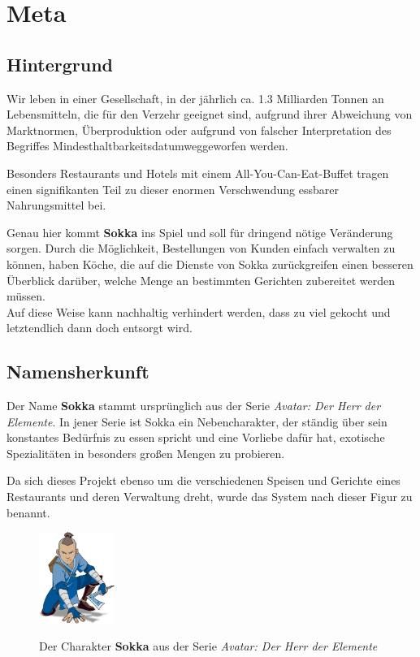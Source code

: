 \chapter{Meta}

\section{Hintergrund}

Wir leben in einer Gesellschaft, in der jährlich ca. 1.3 Milliarden Tonnen an Lebensmitteln, die für den Verzehr geeignet sind, aufgrund ihrer Abweichung von Marktnormen, Überproduktion oder aufgrund von falscher Interpretation des Begriffes \glqq Mindesthaltbarkeitsdatum\grqq\space weggeworfen werden.

Besonders Restaurants und Hotels mit einem All-You-Can-Eat-Buffet tragen einen signifikanten Teil zu dieser enormen Verschwendung essbarer Nahrungsmittel bei.

Genau hier kommt \textbf{Sokka} ins Spiel und soll für dringend nötige Veränderung sorgen. Durch die Möglichkeit, Bestellungen von Kunden einfach verwalten zu können, haben Köche, die auf die Dienste von Sokka zurückgreifen einen besseren Überblick darüber, welche Menge an bestimmten Gerichten zubereitet werden müssen.\\
Auf diese Weise kann nachhaltig verhindert werden, dass zu viel gekocht und letztendlich dann doch entsorgt wird.

\section{Namensherkunft}

Der Name \textbf{Sokka} stammt ursprünglich aus der Serie \textit{Avatar: Der Herr der Elemente}. In jener Serie ist Sokka ein Nebencharakter, der ständig über sein konstantes Bedürfnis zu essen spricht und eine Vorliebe dafür hat, exotische Spezialitäten in besonders großen Mengen zu probieren.

Da sich dieses Projekt ebenso um die verschiedenen Speisen und Gerichte eines Restaurants und deren Verwaltung dreht, wurde das System nach dieser Figur zu benannt.

\begin{figure}[H]
    \begin{center}
        \includegraphics[width=0.22\textwidth]{images/Intro/Sokka.png}
        \caption{Der Charakter \textbf{Sokka} aus der Serie \textit{Avatar: Der Herr der Elemente}}
        \cite{nickelodeon2005}
    \end{center}
\end{figure}

